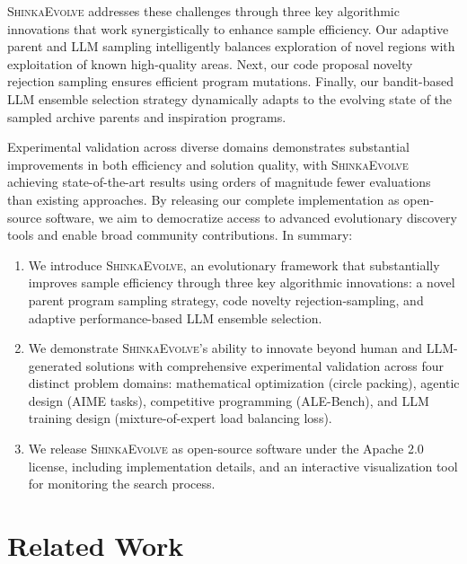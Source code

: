 \documentclass[11pt, a4paper]{include/gdm_format}
\newcommand{\ouralgo}{\textsc{ShinkaEvolve}\xspace}
\begin{document}
\ouralgo addresses these challenges through three key algorithmic innovations that work synergistically to enhance sample efficiency. Our adaptive parent and LLM sampling intelligently balances exploration of novel regions with exploitation of known high-quality areas. Next, our code proposal novelty rejection sampling ensures efficient program mutations. Finally, our bandit-based LLM ensemble selection strategy dynamically adapts to the evolving state of the sampled archive parents and inspiration programs.

Experimental validation across diverse domains demonstrates substantial improvements in both efficiency and solution quality, with \ouralgo achieving state-of-the-art results using orders of magnitude fewer evaluations than existing approaches. By releasing our complete implementation as open-source software, we aim to democratize access to advanced evolutionary discovery tools and enable broad community contributions. In summary:

\begin{enumerate}
    \item We introduce \ouralgo, an evolutionary framework that substantially improves sample efficiency through three key algorithmic innovations: a novel parent program sampling strategy, code novelty rejection-sampling, and adaptive performance-based LLM ensemble selection.
    \item We demonstrate \ouralgo's ability to innovate beyond human and LLM-generated solutions with comprehensive experimental validation across four distinct problem domains: mathematical optimization (circle packing), agentic design (AIME tasks), competitive programming (ALE-Bench), and LLM training design (mixture-of-expert load balancing loss). 
    
    \item We release \ouralgo as open-source software under the Apache 2.0 license, including implementation details, and an interactive visualization tool for monitoring the search process.
\end{enumerate}



\section{Related Work}
\end{document}
